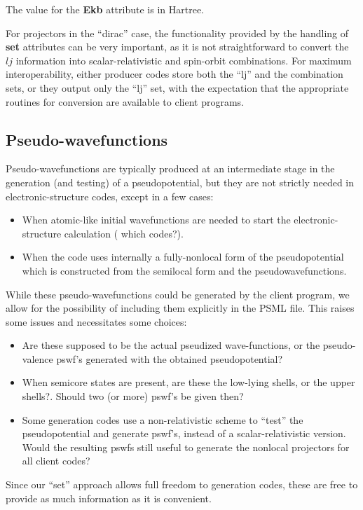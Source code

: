 \documentclass[prb,showpacs,superscriptaddress]{revtex4-1}
\def\att#1{\textbf{#1}}
\begin{document}
The value for the \att{Ekb} attribute is in Hartree.

For projectors in the ``dirac'' case, the functionality provided by
the handling of \att{set} attributes can be very important, as it is
not straightforward to convert the $lj$ information into
scalar-relativistic and spin-orbit combinations. For maximum
interoperability, either producer codes store both the ``lj'' and the
combination sets, or they output only the ``lj'' set, with the
expectation that the appropriate routines for conversion are available
to client programs.

\subsection{Pseudo-wavefunctions}

Pseudo-wavefunctions are typically produced at an intermediate stage in the
generation (and testing) of a pseudopotential, but they are not
strictly needed in electronic-structure codes, except in a few cases:
%
\begin{itemize}
\item When atomic-like initial wavefunctions are needed to start the
  electronic-structure calculation ( which codes?).
\item When the code uses internally a fully-nonlocal form of the
  pseudopotential which is constructed from the semilocal form and the
  pseudowavefunctions.
\end{itemize}
  
While these pseudo-wavefunctions could be generated by the client
program, we allow for the possibility of including them explicitly in
the PSML file. This raises some issues and necessitates some choices:
%
\begin{itemize}
\item Are these supposed to be the actual pseudized wave-functions, or
  the pseudo-valence pswf's generated with the obtained
  pseudopotential?
\item When semicore states are present, are these the low-lying
  shells, or the upper shells?. Should two (or more) pswf's be given
  then?
\item Some generation codes use a non-relativistic scheme to
  ``test'' the pseudopotential and generate pswf's, instead of a
  scalar-relativistic version. Would the resulting pswfs still useful to
  generate the nonlocal projectors for all client codes?
\end{itemize}
%
Since our ``set'' approach allows full freedom to generation codes,
these are free to provide as much information as it is convenient.
\end{document}
